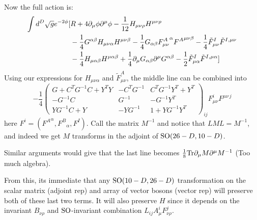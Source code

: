 \documentclass[11pt, class=article, crop=false]{standalone}
\begin{document}
\begin{enumerate}
	Now the full action is:
	\[
	\begin{aligned}
		\int d^D \sqrt{g} e^{-2\phi} [&R + 4 \partial_\mu \phi \partial^\mu \phi  -\frac{1}{12} H_{\mu \nu \rho} H^{\mu \nu \rho}\\
		& 
		- \frac{1}{4} G^{\alpha \beta} H_{\mu \nu \alpha} H^{\mu \nu \beta} - \frac14 G_{\alpha \beta} {F^{A}_{\mu \nu}}^{\alpha} {F^A}^{\mu \nu \beta}  -\frac14 \tilde F^{I}_{\mu \nu} \tilde F^{I, \mu \nu} \\
		&  - \frac{1}{4} H_{\mu \alpha \beta} H^{\mu \alpha \beta} + \frac14 \partial_\mu G_{\alpha \beta} \partial^\mu G^{\alpha \beta} - \frac{1}{2} \tilde F^{I}_{\mu \alpha} \tilde F^{I, \mu \alpha}]
	\end{aligned}
	\] 
	Using our expressions for $H_{\mu \nu \alpha}$ and $\tilde F_{\mu \nu}^A$, the middle line can be combined into
	\[
		-\frac14 \begin{pmatrix}
			G + C^T G^{-1} C + Y^T Y & -C^T G^{-1}  &  C^T G^{-1} Y^T + Y^T\\
			-G^{-1} C & G^{-1} & -G^{-1} Y^T  \\ 
			Y G^{-1} C + Y & -Y G^{-1} & 1 + Y G^{-1} Y^T
		\end{pmatrix}_{ij} F_{\mu \nu}^i F^{\mu \nu\, j}
	\]
	here $F^i = ({F^A}^\alpha, {F^B}_\alpha, F^I)$. Call the matrix $M^{-1}$ and notice that $L M L = M^{-1}$, and indeed we get $M$ transforms in the adjoint of $\mathrm{SO}(26-D, 10-D)$. 
	
	Similar arguments would give that the last line becomes $\frac18 \mathrm{Tr} \partial_\mu M \partial^\mu M^{-1}$ (Too much algebra).
	
	From this, its immediate that any $\mathrm{SO}(10-D, 26-D)$ transformation on the scalar matrix (adjoint rep) and array of vector bosons (vector rep) will preserve both of these last two terms. It will also preserve $H$ since it depends on the invariant $B_{\nu \rho}$ and $\mathrm{SO}$-invariant combination $L_{ij} A^i_\mu F_{\nu \rho}^j$. 
	

\end{enumerate}
\end{document}

